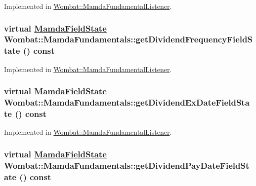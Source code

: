 Implemented in \hyperlink{classWombat_1_1MamdaFundamentalListener_8b5f8895f97cf0e559325348e99bc1bb}{Wombat::Mamda\-Fundamental\-Listener}.\hypertarget{classWombat_1_1MamdaFundamentals_13fb32e1e1b2be497a45b01acee43935}{
\subsubsection[getDividendFrequencyFieldState]{\setlength{\rightskip}{0pt plus 5cm}virtual \hyperlink{namespaceWombat_93aac974f2ab713554fd12a1fa3b7d2a}{Mamda\-Field\-State} Wombat::Mamda\-Fundamentals::get\-Dividend\-Frequency\-Field\-State () const}}
\label{classWombat_1_1MamdaFundamentals_13fb32e1e1b2be497a45b01acee43935}




Implemented in \hyperlink{classWombat_1_1MamdaFundamentalListener_ef68fbedac7b4c18d2883a381faa3c70}{Wombat::Mamda\-Fundamental\-Listener}.\hypertarget{classWombat_1_1MamdaFundamentals_f5f8ae5bbc476f93bc9223d1ae80ca0b}{
\subsubsection[getDividendExDateFieldState]{\setlength{\rightskip}{0pt plus 5cm}virtual \hyperlink{namespaceWombat_93aac974f2ab713554fd12a1fa3b7d2a}{Mamda\-Field\-State} Wombat::Mamda\-Fundamentals::get\-Dividend\-Ex\-Date\-Field\-State () const}}
\label{classWombat_1_1MamdaFundamentals_f5f8ae5bbc476f93bc9223d1ae80ca0b}




Implemented in \hyperlink{classWombat_1_1MamdaFundamentalListener_d36dbb75077ac135466024235858667d}{Wombat::Mamda\-Fundamental\-Listener}.\hypertarget{classWombat_1_1MamdaFundamentals_29de98f5c24812d90fb5efb76f0293e0}{
\subsubsection[getDividendPayDateFieldState]{\setlength{\rightskip}{0pt plus 5cm}virtual \hyperlink{namespaceWombat_93aac974f2ab713554fd12a1fa3b7d2a}{Mamda\-Field\-State} Wombat::Mamda\-Fundamentals::get\-Dividend\-Pay\-Date\-Field\-State () const}}
\label{classWombat_1_1MamdaFundamentals_29de98f5c24812d90fb5efb76f0293e0}




